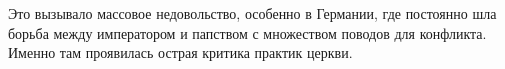 Это вызывало массовое недовольство, особенно в Германии, где постоянно шла борьба между императором и папством с множеством поводов для конфликта. Именно там проявилась острая критика практик церкви.

